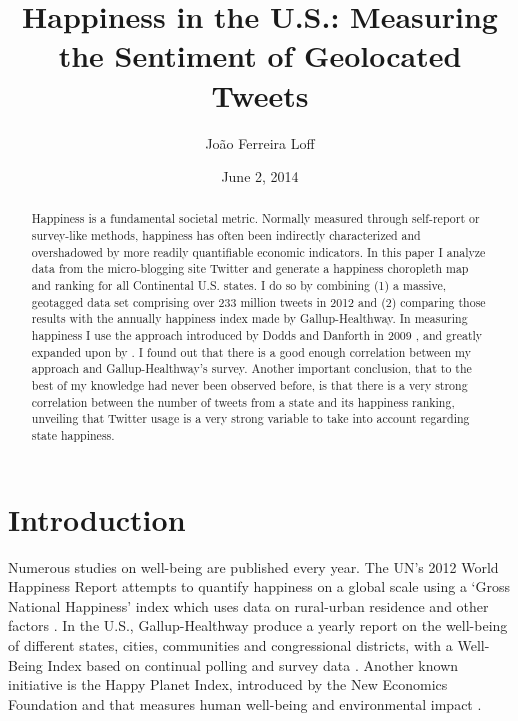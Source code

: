 \documentclass{llncs}
\begin{document}
\title{Happiness in the U.S.: Measuring the Sentiment of Geolocated Tweets}

\author{João Ferreira Loff \newline {}}
\date{June 2, 2014}

\maketitle

\begin{abstract}
Happiness is a fundamental societal metric. Normally measured through self-report or survey-like methods, happiness has often been indirectly characterized and overshadowed by more readily quantifiable economic indicators. In this paper I analyze data from the micro-blogging site Twitter and generate a happiness choropleth map and ranking for all Continental U.S. states. I do so by combining (1) a massive, geotagged data set comprising over 233 million tweets in 2012 and (2) comparing those results with the annually happiness index made by Gallup-Healthway. In measuring happiness I use the approach introduced by Dodds and Danforth in 2009 \cite{Dodds2009}, and greatly expanded upon by \cite{Dodds2011,Mitchell2013}. I found out that there is a good enough correlation between my approach and Gallup-Healthway's survey. Another important conclusion, that to the best of my knowledge had never been observed before, is that there is a very strong correlation between the number of tweets from a state and its happiness ranking, unveiling that Twitter usage is a very strong variable to take into account regarding state happiness.
\end{abstract}


\section{Introduction}

Numerous studies on well-being are published every year. The UN’s 2012 World Happiness Report attempts to quantify happiness on a global scale using a `Gross National Happiness' index which uses data on rural-urban residence and other factors \cite{Layard2013}. In the U.S., Gallup-Healthway produce a yearly report on the well-being of different states, cities, communities and congressional districts, with a Well-Being Index based on continual polling and survey data \cite{GallupHealthway2013}. Another known initiative is the Happy Planet Index, introduced by the New Economics Foundation and that measures human well-being and environmental impact \cite{TheNewEconomicsFoundation2012}.
\end{document}

